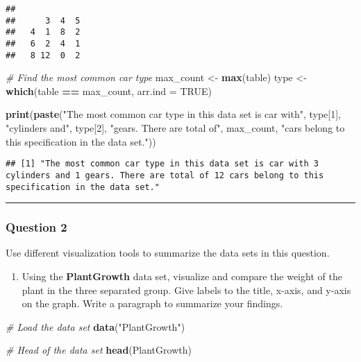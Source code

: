 \documentclass[
]{article}
\newenvironment{Shaded}{\begin{snugshade}}{\end{snugshade}}
\newcommand{\AttributeTok}[1]{\textcolor[rgb]{0.13,0.29,0.53}{#1}}
\newcommand{\CommentTok}[1]{\textcolor[rgb]{0.56,0.35,0.01}{\textit{#1}}}
\newcommand{\ConstantTok}[1]{\textcolor[rgb]{0.56,0.35,0.01}{#1}}
\newcommand{\DecValTok}[1]{\textcolor[rgb]{0.00,0.00,0.81}{#1}}
\newcommand{\FunctionTok}[1]{\textcolor[rgb]{0.13,0.29,0.53}{\textbf{#1}}}
\newcommand{\NormalTok}[1]{#1}
\newcommand{\OtherTok}[1]{\textcolor[rgb]{0.56,0.35,0.01}{#1}}
\newcommand{\SpecialCharTok}[1]{\textcolor[rgb]{0.81,0.36,0.00}{\textbf{#1}}}
\newcommand{\StringTok}[1]{\textcolor[rgb]{0.31,0.60,0.02}{#1}}
\providecommand{\tightlist}{%
  \setlength{\itemsep}{0pt}\setlength{\parskip}{0pt}}
\begin{document}
\begin{verbatim}
##    
##      3  4  5
##   4  1  8  2
##   6  2  4  1
##   8 12  0  2
\end{verbatim}

\begin{Shaded}
\begin{Highlighting}[]
\CommentTok{\# Find the most common car type}
\NormalTok{max\_count }\OtherTok{\textless{}{-}} \FunctionTok{max}\NormalTok{(table)}
\NormalTok{type }\OtherTok{\textless{}{-}} \FunctionTok{which}\NormalTok{(table }\SpecialCharTok{==}\NormalTok{ max\_count, }\AttributeTok{arr.ind =} \ConstantTok{TRUE}\NormalTok{)}

\FunctionTok{print}\NormalTok{(}\FunctionTok{paste}\NormalTok{(}\StringTok{"The most common car type in this data set is car with"}\NormalTok{, type[}\DecValTok{1}\NormalTok{], }\StringTok{"cylinders and"}\NormalTok{, type[}\DecValTok{2}\NormalTok{], }\StringTok{"gears. There are total of"}\NormalTok{, max\_count, }\StringTok{"cars belong to this specification in the data set."}\NormalTok{))}
\end{Highlighting}
\end{Shaded}

\begin{verbatim}
## [1] "The most common car type in this data set is car with 3 cylinders and 1 gears. There are total of 12 cars belong to this specification in the data set."
\end{verbatim}

\begin{center}\rule{0.5\linewidth}{0.5pt}\end{center}

\subsubsection{Question 2}\label{question-2}

Use different visualization tools to summarize the data sets in this
question.

\begin{enumerate}
\def\labelenumi{\alph{enumi}.}
\tightlist
\item
  Using the \textbf{PlantGrowth} data set, visualize and compare the
  weight of the plant in the three separated group. Give labels to the
  title, x-axis, and y-axis on the graph. Write a paragraph to summarize
  your findings.
\end{enumerate}

\begin{Shaded}
\begin{Highlighting}[]
\CommentTok{\# Load the data set}
\FunctionTok{data}\NormalTok{(}\StringTok{"PlantGrowth"}\NormalTok{)}

\CommentTok{\# Head of the data set}
\FunctionTok{head}\NormalTok{(PlantGrowth)}
\end{Highlighting}
\end{Shaded}
\end{document}
